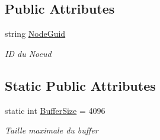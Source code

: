\subsection*{Public Attributes}
\begin{DoxyCompactItemize}
\item 
string \hyperlink{class_node_net_1_1_network_1_1_nodes_1_1_node_a5bc8c3022d70a566cb208b8c99790023}{Node\+Guid}
\begin{DoxyCompactList}\small\item\em ID du Noeud \end{DoxyCompactList}\end{DoxyCompactItemize}
\subsection*{Static Public Attributes}
\begin{DoxyCompactItemize}
\item 
static int \hyperlink{class_node_net_1_1_network_1_1_nodes_1_1_node_a32ac26d575d8bc1d0cb7a5aea9c0118c}{Buffer\+Size} = 4096
\begin{DoxyCompactList}\small\item\em Taille maximale du buffer \end{DoxyCompactList}\end{DoxyCompactItemize}
